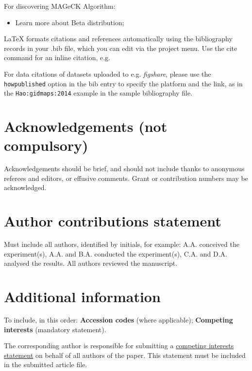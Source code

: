 \documentclass[fleqn,10pt]{wlscirep}
\begin{document}
For discovering MAGeCK Algorithm:
\begin{itemize}
    \item Learn more about Beta distribution;
\end{itemize}



\noindent LaTeX formats citations and references automatically using the bibliography records in your .bib file, which you can edit via the project menu. Use the cite command for an inline citation, e.g. 

For data citations of datasets uploaded to e.g. \emph{figshare}, please use the \verb|howpublished| option in the bib entry to specify the platform and the link, as in the \verb|Hao:gidmaps:2014| example in the sample bibliography file.

\section*{Acknowledgements (not compulsory)}

Acknowledgements should be brief, and should not include thanks to anonymous referees and editors, or effusive comments. Grant or contribution numbers may be acknowledged.

\section*{Author contributions statement}

Must include all authors, identified by initials, for example:
A.A. conceived the experiment(s),  A.A. and B.A. conducted the experiment(s), C.A. and D.A. analysed the results.  All authors reviewed the manuscript. 

\section*{Additional information}

To include, in this order: \textbf{Accession codes} (where applicable); \textbf{Competing interests} (mandatory statement). 

The corresponding author is responsible for submitting a \href{http://www.nature.com/srep/policies/index.html#competing}{competing interests statement} on behalf of all authors of the paper. This statement must be included in the submitted article file.
\end{document}
